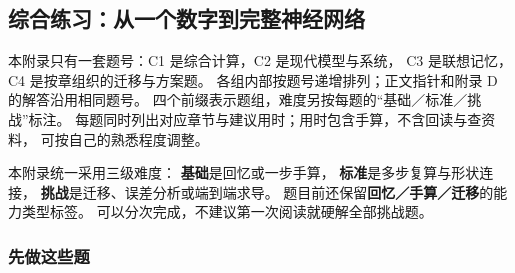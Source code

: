 \subsection{综合练习：从一个数字到完整神经网络}

本附录只有一套题号：C1 是综合计算，C2 是现代模型与系统，
C3 是联想记忆，C4 是按章组织的迁移与方案题。
各组内部按题号递增排列；正文指针和附录 D 的解答沿用相同题号。
四个前缀表示题组，难度另按每题的“基础／标准／挑战”标注。
每题同时列出对应章节与建议用时；用时包含手算，不含回读与查资料，
可按自己的熟悉程度调整。

本附录统一采用三级难度：
\textbf{基础}是回忆或一步手算，
\textbf{标准}是多步复算与形状连接，
\textbf{挑战}是迁移、误差分析或端到端求导。
题目前还保留\textbf{回忆／手算／迁移}的能力类型标签。
可以分次完成，不建议第一次阅读就硬解全部挑战题。

\subsubsection{先做这些题}

